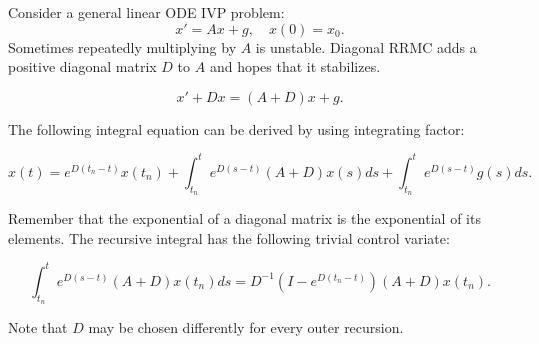 \documentclass[a4paper,12pt]{article}
\begin{document}
\begin{definition}[DRRMC]
    Consider a general linear ODE IVP problem:
    \begin{equation}
        x' = Ax+g, \quad x(0)= x_{0}.
    \end{equation}
    Sometimes repeatedly multiplying by $A$ is unstable.
    Diagonal RRMC adds a positive diagonal matrix $D$
    to $A$ and hopes that it stabilizes.

    \begin{equation}
        x' + Dx = (A+D)x+g.
    \end{equation}

    The following integral equation can be derived by using integrating factor:

    \begin{equation}\label{eq:int eq DRRMC}
        x(t)= e^{D(t_{n}-t)}x(t_{n}) + \int_{t_{n}}^{t} e^{D(s-t)}(A+D)x(s)ds+\int_{t_{n}}^{t} e^{D(s-t)}g(s)ds.
    \end{equation}

    Remember that the exponential of a diagonal matrix is the exponential of its elements.
    The recursive integral has the following trivial control variate:

    \begin{equation}\label{eq: CV DRRMC}
        \int_{t_{n}}^{t}  e^{D(s-t)}(A+D)x(t_{n})ds = D^{-1}(I-e^{D(t_{n}-t)})(A+D)x(t_{n}).
    \end{equation}

    Note that $D$ may be chosen differently for every outer recursion.
\end{definition}
\end{document}
